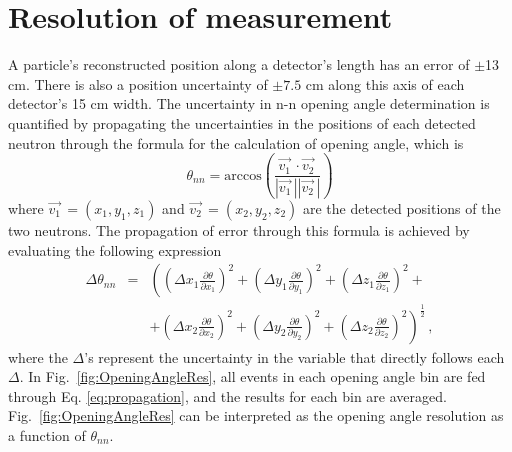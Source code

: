 \section{Resolution of measurement}
A particle's reconstructed position along a detector's length has an error of $\pm$13 cm.
There is also a position uncertainty of $\pm 7.5$ cm along this axis of each detector's 15 cm width.
The uncertainty in n-n opening angle determination is quantified by propagating the uncertainties in the positions of each detected neutron through the formula for the calculation of opening angle, which is
\begin{displaymath}
    \theta_{nn} = \text{arccos}\left(\frac{\vec{v_{1}}^{\,}\cdot\vec{v_{2}}^{\,}}{|\vec{v_{1}}^{\,}||\vec{v_{2}}^{\,}|}\right)
\end{displaymath}
where $\vec{v_{1}}^{\,} = (x_1,y_1,z_1)$ and $\vec{v_{2}}^{\,} = (x_2,y_2,z_2)$ are the detected positions of the two neutrons.
The propagation of error through this formula is achieved by evaluating the following expression
\begin{eqnarray}
\label{eq:propagation}
 \Delta \theta_{nn} & = & \left( \left(\Delta x_1 \frac{\partial \theta}{\partial x_1}\right)^{2} + \left(\Delta y_1 \frac{\partial \theta}{\partial y_1}\right)^{2} + \left(\Delta z_1 \frac{\partial \theta}{\partial z_1}\right)^{2} + \right. \\
 & & \left. + \left(\Delta x_2 \frac{\partial \theta}{\partial x_2}\right)^{2} + \left(\Delta y_2\frac{\partial \theta}{\partial y_2}\right)^{2} + \left(\Delta z_2 \frac{\partial \theta}{\partial z_2}\right)^{2} \right) ^{\frac{1}{2}} \, ,  \nonumber
\end{eqnarray}
where the $\Delta$'s represent the uncertainty in the variable that directly follows each $\Delta$.
In Fig.~\ref{fig:OpeningAngleRes}, all events in each opening angle bin are fed through Eq. \ref{eq:propagation}, and the results for each bin are averaged.
Fig.~\ref{fig:OpeningAngleRes} can be interpreted as the opening angle resolution as a function of $\theta_{nn}$.
